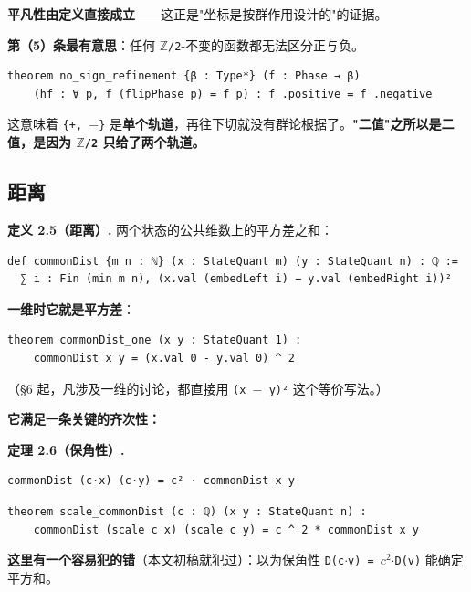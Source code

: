 \documentclass[11pt,a4paper]{ctexart}
\begin{document}
\textbf{平凡性由定义直接成立}——这正是"坐标是按群作用设计的"的证据。

\textbf{第（5）条最有意思}：任何 \texttt{\ensuremath{\mathbb{Z}}/2}-不变的函数都无法区分正与负。

\begin{lstlisting}
theorem no_sign_refinement {β : Type*} (f : Phase → β)
    (hf : ∀ p, f (flipPhase p) = f p) : f .positive = f .negative
\end{lstlisting}

这意味着 \texttt{\{+, \ensuremath{-}\}} 是\textbf{单个轨道}，再往下切就没有群论根据了。\textbf{"二值"之所以是二值，是因为 \texttt{\ensuremath{\mathbb{Z}}/2} 只给了两个轨道。}

\subsection{距离}

\textbf{定义 2.5（距离）.} 两个状态的公共维数上的平方差之和：

\begin{lstlisting}
def commonDist {m n : ℕ} (x : StateQuant m) (y : StateQuant n) : ℚ :=
  ∑ i : Fin (min m n), (x.val (embedLeft i) − y.val (embedRight i))²
\end{lstlisting}

\textbf{一维时它就是平方差}：

\begin{lstlisting}
theorem commonDist_one (x y : StateQuant 1) :
    commonDist x y = (x.val 0 - y.val 0) ^ 2
\end{lstlisting}

（§6 起，凡涉及一维的讨论，都直接用 \texttt{(x \ensuremath{-} y)²} 这个等价写法。）

\textbf{它满足一条关键的齐次性：}

\textbf{定理 2.6（保角性）.}

\begin{lstlisting}
commonDist (c·x) (c·y) = c² · commonDist x y
\end{lstlisting}

\begin{lstlisting}
theorem scale_commonDist (c : ℚ) (x y : StateQuant n) :
    commonDist (scale c x) (scale c y) = c ^ 2 * commonDist x y
\end{lstlisting}

\textbf{这里有一个容易犯的错}（本文初稿就犯过）：以为保角性 \texttt{D(c\ensuremath{\cdot}v) = \ensuremath{c^{2}}\ensuremath{\cdot}D(v)} 能确定平方和。
\end{document}
